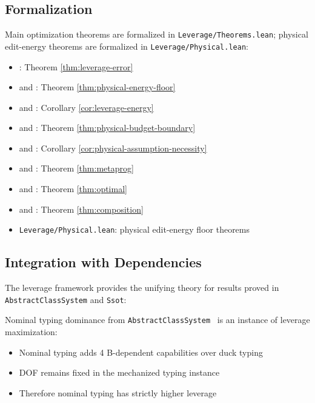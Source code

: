 \subsection{Formalization}

Main optimization theorems are formalized in \texttt{Leverage/Theorems.lean}; physical edit-energy theorems are formalized in \texttt{Leverage/Physical.lean}:
\begin{itemize}
\item {}: Theorem \ref{thm:leverage-error}
\item {} and : Theorem \ref{thm:physical-energy-floor}
\item {} and : Corollary \ref{cor:leverage-energy}
\item {} and : Theorem \ref{thm:physical-budget-boundary}
\item {} and : Corollary \ref{cor:physical-assumption-necessity}
\item {} and : Theorem \ref{thm:metaprog}
\item {} and : Theorem \ref{thm:optimal}
\item {} and : Theorem \ref{thm:composition}
\item \texttt{Leverage/Physical.lean}: physical edit-energy floor theorems
\end{itemize}

\subsection{Integration with Dependencies}

The leverage framework provides the unifying theory for results proved in \texttt{AbstractClassSystem} and \texttt{Ssot}:

\begin{theorem}\label{thm:paper1-integration}
Nominal typing dominance from \texttt{AbstractClassSystem}~\cite{paper1_typing_discipline} is an instance of leverage maximization:
\begin{itemize}
\item Nominal typing adds 4 B-dependent capabilities over duck typing
\item DOF remains fixed in the mechanized typing instance
\item Therefore nominal typing has strictly higher leverage
\end{itemize}
\end{theorem}

